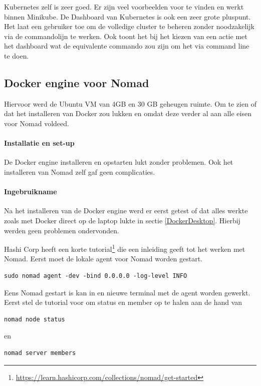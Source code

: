 Kubernetes zelf is zeer goed. Er zijn veel voorbeelden voor te vinden en werkt binnen Minikube. De Dashboard van Kubernetes is ook een zeer grote pluspunt. Het laat een gebruiker toe om de volledige cluster te beheren zonder noodzakelijk via de commandolijn te werken. Ook toont het bij het kiezen van een actie met het dashboard wat de equivalente commando zou zijn om het via command line te doen.


\subsection{Docker engine voor Nomad}
Hiervoor werd de Ubuntu VM van 4GB en 30 GB geheugen ruimte. Om te zien of dat het installeren van Docker zou lukken en omdat deze verder al aan alle eisen voor Nomad voldeed.
\paragraph{Installatie en set-up}
De Docker engine installeren en opstarten lukt zonder problemen. Ook het installeren van Nomad zelf gaf geen complicaties.
\paragraph{Ingebruikname}
Na het installeren van de Docker engine werd er eerst getest of dat alles werkte zoals met Docker direct op de laptop lukte in sectie \ref{DockerDesktop}. Hierbij werden geen problemen ondervonden.

Hashi Corp heeft een korte tutorial\footnote{\url{https://learn.hashicorp.com/collections/nomad/get-started}} die een inleiding geeft tot het werken met Nomad. Eerst moet de lokale agent voor Nomad worden gestart.
\begin{verbatim}
sudo nomad agent -dev -bind 0.0.0.0 -log-level INFO
\end{verbatim}
Eens Nomad gestart is kan in en nieuwe terminal met de agent worden gewerkt. Eerst stel de tutorial voor om status en member op te halen aan de hand van
\begin{verbatim}
nomad node status
\end{verbatim}
en
\begin{verbatim}
nomad server members
\end{verbatim}

